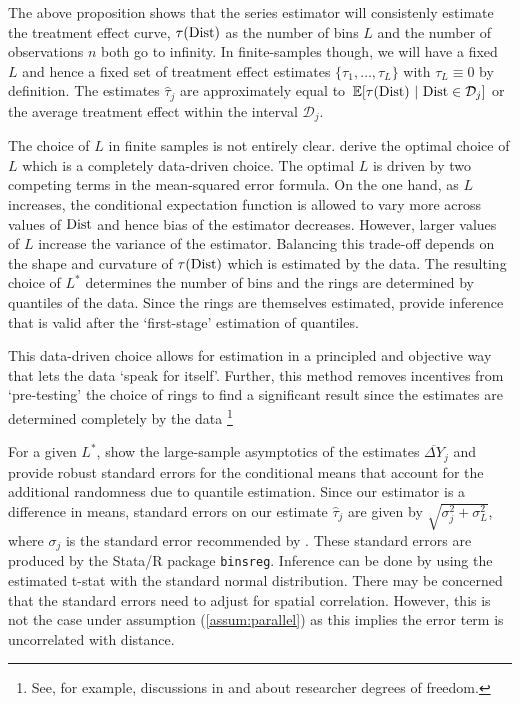 The above proposition shows that the series estimator will consistenly estimate the treatment effect curve, $\tau(\text{Dist})$ as the number of bins $L$ and the number of observations $n$ both go to infinity. In finite-samples though, we will have a fixed $L$ and hence a fixed set of treatment effect estimates $\{ \tau_1, \dots, \tau_{L}\}$ with $\tau_L \equiv 0$ by definition. The estimates $\hat{\tau}_j$ are approximately equal to $\expec{\tau(\dist)}{\dist \in \mathcal{D}_j}$ or the average treatment effect within the interval $\mathcal{D}_j$.

The choice of $L$ in finite samples is not entirely clear. \citet{cattaneo2019binscatter} derive the optimal choice of $L$ which is a completely data-driven choice. The optimal $L$ is driven by two competing terms in the mean-squared error formula. On the one hand, as $L$ increases, the conditional expectation function is allowed to vary more across values of $\text{Dist}$ and hence bias of the estimator decreases. However, larger values of $L$ increase the variance of the estimator. Balancing this trade-off depends on the shape and curvature of $\tau(\text{Dist})$ which is estimated by the data. The resulting choice of $L^*$ determines the number of bins and the rings are determined by quantiles of the data. Since the rings are themselves estimated, \citet{cattaneo2019binscatter} provide inference that is valid after the `first-stage' estimation of quantiles. 

This data-driven choice allows for estimation in a principled and objective way that lets the data `speak for itself'. Further, this method removes incentives from `pre-testing' the choice of rings to find a significant result since the estimates are determined completely by the data \footnote{See, for example, discussions in \citet{andrews2019identification} and \citet{mccloskey2020critical} about researcher degrees of freedom.} 

For a given $L^*$, \citet{cattaneo2019binscatter} show the large-sample asymptotics of the estimates $\overline{\Delta Y}_j$ and provide robust standard errors for the conditional means that account for the additional randomness due to quantile estimation. Since our estimator is a difference in means, standard errors on our estimate $\hat{\tau}_j$ are given by $\sqrt{\sigma^2_j + \sigma^2_L}$, where $\sigma_j$ is the standard error recommended by \citet{cattaneo2019binscatter}. These standard errors are produced by the Stata/R package \texttt{binsreg}. Inference can be done by using the estimated t-stat with the standard normal distribution. There may be concerned that the standard errors need to adjust for spatial correlation. However, this is not the case under assumption (\ref{assum:parallel}) as this implies the error term is uncorrelated with distance.

